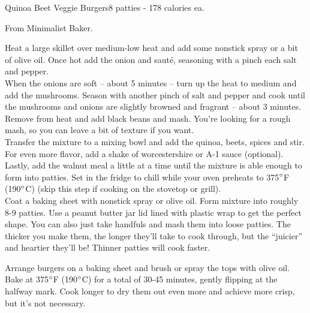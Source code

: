 \begin{recipe}{Quinoa Beet Veggie Burgers}{8 patties - 178 calories ea.}{}

\freeform From Minimalist Baker.


Heat a large skillet over medium-low heat and add some nonstick spray or a bit of olive oil. Once hot add the onion and sauté, seasoning with a pinch each salt and pepper.\\

When the onions are soft – about 5 minutes – turn up the heat to medium and add the mushrooms. Season with another pinch of salt and pepper and cook until the mushrooms and onions are slightly browned and fragrant – about 3 minutes.\\

Remove from heat and add black beans and mash. You’re looking for a rough mash, so you can leave a bit of texture if you want.\\

Transfer the mixture to a mixing bowl and add the quinoa, beets, spices and stir. For even more flavor, add a shake of worcestershire or A-1 sauce (optional).\\

Lastly, add the walnut meal a little at a time until the mixture is able enough to form into patties. Set in the fridge to chill while your oven preheats to 375$\degree$F (190$\degree$C) (skip this step if cooking on the stovetop or grill).\\

Coat a baking sheet with nonstick spray or olive oil. Form mixture into roughly 8-9 patties. Use a peanut butter jar lid lined with plastic wrap to get the perfect shape. You can also just take handfuls and mash them into loose patties. The thicker you make them, the longer they’ll take to cook through, but the “juicier” and heartier they’ll be! Thinner patties will cook faster.\newpage

Arrange burgers on a baking sheet and brush or spray the tops with olive oil. Bake at 375$\degree$F (190$\degree$C) for a total of 30-45 minutes, gently flipping at the halfway mark. Cook longer to dry them out even more and achieve more crisp, but it’s not necessary.\\


\end{recipe}
